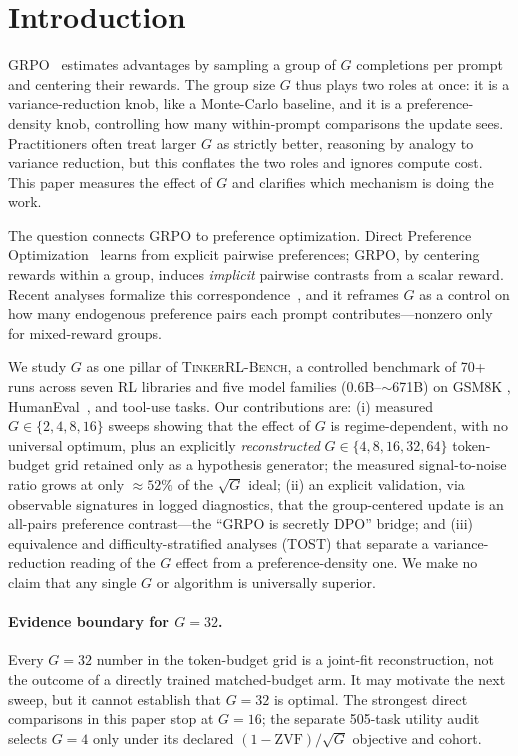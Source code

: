 \documentclass{article}
\newcommand{\ours}{\textsc{TinkerRL-Bench}}
\begin{document}
 \section{Introduction}
\label{sec:p3-intro}
GRPO~\citep{shao2024deepseekmath, guo2025deepseekr1} estimates advantages by
sampling a group of $G$ completions per prompt and centering their rewards. The
group size $G$ thus plays two roles at once: it is a variance-reduction knob, like
a Monte-Carlo baseline, and it is a preference-density knob, controlling how many
within-prompt comparisons the update sees. Practitioners often treat larger $G$ as
strictly better, reasoning by analogy to variance reduction, but this conflates the
two roles and ignores compute cost. This paper measures the effect of $G$ and
clarifies which mechanism is doing the work.

The question connects GRPO to preference optimization. Direct Preference
Optimization~\citep{rafailov2024direct} learns from explicit pairwise preferences;
GRPO, by centering rewards within a group, induces \emph{implicit} pairwise
contrasts from a scalar reward. Recent analyses formalize this
correspondence~\citep{wu2025grpo_dpo, liu2026gdpo}, and it reframes $G$ as a control
on how many endogenous preference pairs each prompt contributes---nonzero only for
mixed-reward groups.

We study $G$ as one pillar of \ours{}, a controlled benchmark of 70+ runs across
seven RL libraries and five model families ($0.6$B--$\sim$671B) on GSM8K
\citep{cobbe2021training}, HumanEval~\citep{chen2021codex}, and tool-use tasks. Our
contributions are: (i) measured $G\in\{2,4,8,16\}$ sweeps showing that the effect
of $G$ is regime-dependent, with no universal optimum, plus an explicitly
\emph{reconstructed} $G\in\{4,8,16,32,64\}$ token-budget grid retained only as a
hypothesis generator; the measured signal-to-noise ratio grows at only
$\approx 52\%$ of the $\sqrt{G}$ ideal;
(ii) an explicit validation, via observable signatures in logged diagnostics, that the group-centered
update is an all-pairs preference contrast---the ``GRPO is secretly DPO'' bridge;
and (iii) equivalence and difficulty-stratified analyses (TOST) that separate a
variance-reduction reading of the $G$ effect from a preference-density one. We make
no claim that any single $G$ or algorithm is universally superior.

\paragraph{Evidence boundary for $G{=}32$.}
Every $G{=}32$ number in the token-budget grid is a joint-fit reconstruction,
not the outcome of a directly trained matched-budget arm. It may motivate the
next sweep, but it cannot establish that $G{=}32$ is optimal. The strongest
direct comparisons in this paper stop at $G{=}16$; the separate 505-task
utility audit selects $G{=}4$ only under its declared
$(1-\mathrm{ZVF})/\sqrt{G}$ objective and cohort.
\end{document}
